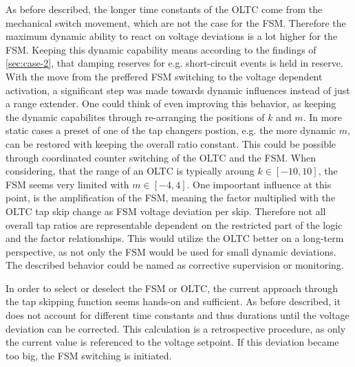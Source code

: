 As before described, the longer time constants of the \acs{OLTC} come from the mechanical switch movement, which are not the case for the \acs{FSM}.
Therefore the maximum dynamic ability to react on voltage deviations is a lot higher for the \acs{FSM}.
Keeping this dynamic capability means according to the findings of \autoref{sec:case-2}, that damping reserves for e.g. short-circuit events is held in reserve.  
With the move from the preffered \acs{FSM} switching to the voltage dependent activation, a significant step was made towards dynamic influences instead of just a \glqq range extender\grqq.
One could think of even improving this behavior, as keeping the dynamic capabilites through re-arranging the positions of $k$ and $m$.
In more static cases a preset of one of the tap changers postion, e.g. the more dynamic $m$, can be restored with keeping the overall ratio constant.
This could be possible through coordinated counter switching of the \acs{OLTC} and the \acs{FSM}.
When considering, that the range of an \acs{OLTC} is typically aroung $k \in [-10,10]$, the FSM seems very limited with $m \in [-4,4]$.
One impoortant influence at this point, is the amplification of the \acs{FSM}, meaning the factor multiplied with the \acs{OLTC} tap skip change as \acs{FSM} voltage deviation per skip. 
Therefore not all overall tap ratios are representable dependent on the restricted part of the logic and the factor relationships.
This would utilize the \acs{OLTC} better on a long-term perspective, as not only the \acs{FSM} would be used for small dynamic deviations.
The described behavior could be named as corrective supervision or monitoring. 

In order to select or deselect the \acs{FSM} or \acs{OLTC}, the current approach through the tap skipping function seems hands-on and sufficient.
As before described, it does not account for different time constants and thus durations until the voltage deviation can be corrected.
This calculation is a retrospective procedure, as only the current value is referenced to the voltage setpoint.
If this deviation became too big, the \acs{FSM} switching is initiated.

